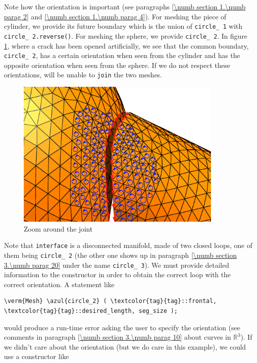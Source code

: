 Note how the orientation is important (see paragraphs \ref{\numb section 1.\numb parag 2}
and \ref{\numb section 1.\numb parag 4}).
For meshing the piece of cylinder, we provide its future boundary which is the union of
{\small\tt circle\_\,1} with {\small\tt circle\_\,2.reverse()}.
For meshing the sphere, we provide {\small\tt circle\_\,2}.
In figure \ref{\numb section 3.\numb fig 7}, where a crack has been opened artificially,
we see that the common boundary, {\small\tt circle\_\,2}, has a certain orientation when seen
from the cylinder and has the opposite orientation when seen from the sphere.
If we do not respect these orientations, {\maniFEM} will be unable to {\small\tt join} the two
meshes.

\begin{figure}[ht] \centering
 \includegraphics[width=100mm]{crack}
  \caption{Zoom around the joint}
  \label{\numb section 3.\numb fig 7}
\end{figure}

Note that {\small\tt interface} is a disconnected manifold, made of two closed loops,
one of them being {\small\tt circle\_\,2} (the other one shows up in
paragraph \ref{\numb section 3.\numb parag 20} under the name {\small\tt circle\_\,3}).
We must provide detailed information to the {\small\tt{}} constructor in order to
obtain the correct loop with the correct orientation.
A statement like

\begin{Verbatim}[commandchars=\\\{\},formatcom=\small\tt,
   baselinestretch=0.94,framesep=2mm                     ]
   \verm{Mesh} \azul{circle_2} ( \textcolor{tag}{tag}::frontal, \textcolor{tag}{tag}::desired_length, seg_size );
\end{Verbatim}

\noindent would produce a run-time error asking the user to specify the orientation
(see comments in paragraph \ref{\numb section 3.\numb parag 10} about curves in $ \mathbb{R}^3 $).
If we didn't care about the orientation (but we do care in this example), we could use
a constructor like

